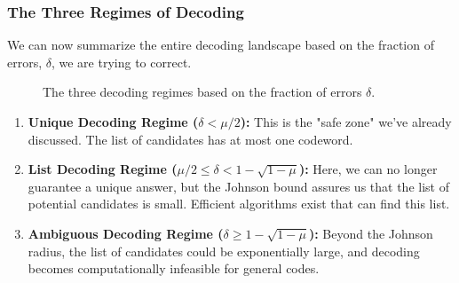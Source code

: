 \documentclass{article}
\begin{document}
\subsubsection{The Three Regimes of Decoding}
We can now summarize the entire decoding landscape based on the fraction of errors, $\delta$, we are trying to correct.

\begin{figure}[h!]
\centering
{}
\caption{The three decoding regimes based on the fraction of errors $\delta$.}
\label{fig:decoding_regimes}
\end{figure}


\begin{enumerate}
    \item \textbf{Unique Decoding Regime ($\delta < \mu/2$):} This is the "safe zone" we've already discussed. The list of candidates has at most one codeword.
    \item \textbf{List Decoding Regime ($\mu/2 \leq \delta < 1-\sqrt{1-\mu}$):} Here, we can no longer guarantee a unique answer, but the Johnson bound assures us that the list of potential candidates is small. Efficient algorithms exist that can find this list.
    \item \textbf{Ambiguous Decoding Regime ($\delta \geq 1-\sqrt{1-\mu}$):} Beyond the Johnson radius, the list of candidates could be exponentially large, and decoding becomes computationally infeasible for general codes.
\end{enumerate}
\end{document}
